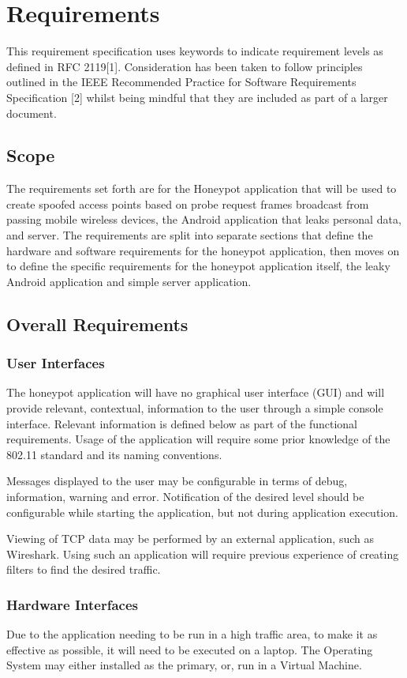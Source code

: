 \section{Requirements}
This requirement specification uses keywords to indicate requirement levels as defined in RFC 2119[1]. Consideration has been taken to follow principles outlined in the IEEE Recommended Practice for Software Requirements Specification [2] whilst being mindful that they are included as part of a larger document.

\subsection{Scope}
The requirements set forth are for the Honeypot application that will be used to create spoofed access points based on probe request frames broadcast from passing mobile wireless devices, the Android application that leaks personal data, and server. The requirements are split into separate sections that define the hardware and software requirements for the honeypot application, then moves on to define the specific requirements for the honeypot application itself, the leaky Android application and simple server application.

\subsection{Overall Requirements}
\subsubsection{User Interfaces}
The honeypot application will have no graphical user interface (GUI) and will provide relevant, contextual, information to the user through a simple console interface. Relevant information is defined below as part of the functional requirements. Usage of the application will require some prior knowledge of the 802.11 standard and its naming conventions.

Messages displayed to the user may be configurable in terms of debug, information, warning and error. Notification of the desired level should be configurable while starting the application, but not during application execution.

Viewing of TCP data may be performed by an external application, such as Wireshark. Using such an application will require previous experience of creating filters to find the desired traffic.

\subsubsection{Hardware Interfaces}
Due to the application needing to be run in a high traffic area, to make it as effective as possible, it will need to be executed on a laptop. The Operating System may either installed as the primary, or, run in a Virtual Machine.

